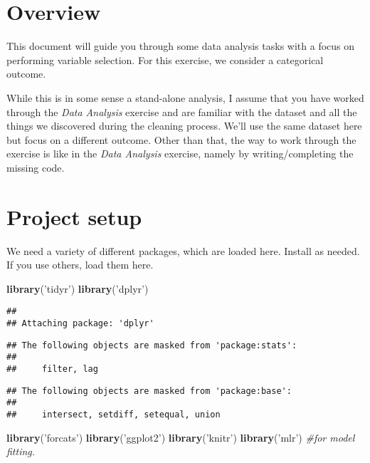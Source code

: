 \documentclass[]{article}
\title{}
\author{}
\date{}
\newenvironment{Shaded}{\begin{snugshade}}{\end{snugshade}}
\newcommand{\CommentTok}[1]{\textcolor[rgb]{0.56,0.35,0.01}{\textit{#1}}}
\newcommand{\KeywordTok}[1]{\textcolor[rgb]{0.13,0.29,0.53}{\textbf{#1}}}
\newcommand{\NormalTok}[1]{#1}
\newcommand{\StringTok}[1]{\textcolor[rgb]{0.31,0.60,0.02}{#1}}
\begin{document}
\hypertarget{overview}{%
\section{Overview}\label{overview}}

This document will guide you through some data analysis tasks with a
focus on performing variable selection. For this exercise, we consider a
categorical outcome.

While this is in some sense a stand-alone analysis, I assume that you
have worked through the \emph{Data Analysis} exercise and are familiar
with the dataset and all the things we discovered during the cleaning
process. We'll use the same dataset here but focus on a different
outcome. Other than that, the way to work through the exercise is like
in the \emph{Data Analysis} exercise, namely by writing/completing the
missing code.

\hypertarget{project-setup}{%
\section{Project setup}\label{project-setup}}

We need a variety of different packages, which are loaded here. Install
as needed. If you use others, load them here.

\begin{Shaded}
\begin{Highlighting}[]
\KeywordTok{library}\NormalTok{(}\StringTok{'tidyr'}\NormalTok{)}
\KeywordTok{library}\NormalTok{(}\StringTok{'dplyr'}\NormalTok{)}
\end{Highlighting}
\end{Shaded}

\begin{verbatim}
## 
## Attaching package: 'dplyr'
\end{verbatim}

\begin{verbatim}
## The following objects are masked from 'package:stats':
## 
##     filter, lag
\end{verbatim}

\begin{verbatim}
## The following objects are masked from 'package:base':
## 
##     intersect, setdiff, setequal, union
\end{verbatim}

\begin{Shaded}
\begin{Highlighting}[]
\KeywordTok{library}\NormalTok{(}\StringTok{'forcats'}\NormalTok{)}
\KeywordTok{library}\NormalTok{(}\StringTok{'ggplot2'}\NormalTok{)}
\KeywordTok{library}\NormalTok{(}\StringTok{'knitr'}\NormalTok{)}
\KeywordTok{library}\NormalTok{(}\StringTok{'mlr'}\NormalTok{) }\CommentTok{#for model fitting.}
\end{Highlighting}
\end{Shaded}
\end{document}
